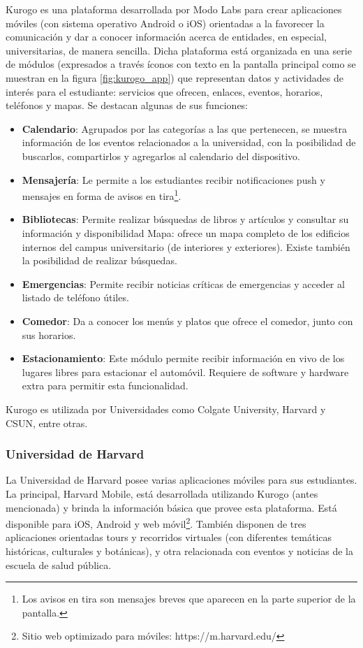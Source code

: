 Kurogo es una plataforma desarrollada por Modo Labs para crear aplicaciones
móviles (con sistema operativo Android o iOS) orientadas a la favorecer la
comunicación y dar a conocer información acerca de entidades, en especial,
universitarias, de manera sencilla. Dicha plataforma está organizada en una
serie de módulos (expresados a través íconos con texto en la pantalla principal
como se muestran en la figura \ref{fig:kurogo_app}) que representan datos y
actividades de interés para el estudiante:
servicios que ofrecen, enlaces, eventos, horarios, teléfonos y mapas. Se destacan algunas de
sus funciones:
\begin{itemize}
  \item \textbf{Calendario}: Agrupados por las categorías a las que pertenecen,
  se muestra información de los eventos relacionados a la universidad, con la
  posibilidad de buscarlos, compartirlos y agregarlos al calendario del dispositivo.
  \item \textbf{Mensajería}: Le permite a los estudiantes recibir notificaciones
  push y mensajes en forma de avisos en tira\footnote{Los avisos en tira son
  mensajes breves que aparecen en la parte superior de la pantalla.}.
  \item \textbf{Bibliotecas}: Permite realizar búsquedas de libros y artículos y
  consultar su información y disponibilidad Mapa: ofrece un mapa completo de los
  edificios internos del campus universitario (de interiores y exteriores).
  Existe también la posibilidad de realizar búsquedas.
  \item \textbf{Emergencias}: Permite recibir noticias críticas de emergencias y
  acceder al listado de teléfono útiles.
  \item \textbf{Comedor}: Da a conocer los menús y platos que ofrece el comedor,
  junto con sus horarios.
  \item \textbf{Estacionamiento}: Este módulo permite recibir información en
  vivo de los lugares libres para estacionar el automóvil. Requiere de software
  y hardware extra para permitir esta funcionalidad.
\end{itemize}
Kurogo es utilizada por Universidades como Colgate University, Harvard y CSUN, entre otras.
\subsubsection{Universidad de Harvard}
\label{aplicaciones_existentes_harvard}
La Universidad de Harvard\cite{HarvardMobile} posee varias aplicaciones
móviles para sus estudiantes.
La principal, Harvard Mobile, está desarrollada utilizando Kurogo (antes
mencionada) y brinda la información básica que provee esta plataforma. Está
disponible para iOS, Android y web móvil\footnote{Sitio web optimizado para
móviles: https://m.harvard.edu/}.
También disponen de tres aplicaciones orientadas tours y recorridos virtuales
(con diferentes temáticas históricas, culturales y botánicas), y otra
relacionada con eventos y noticias de la escuela de salud pública.

